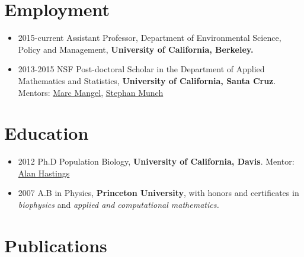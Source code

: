 \documentclass[10pt,sans]{moderncv}        %
\begin{document}
\makecvtitle


\hypersetup{urlcolor=links}

\hypertarget{employment}{%
\section{Employment}\label{employment}}

\begin{itemize}
\item
  2015-current Assistant Professor, Department of Environmental Science,
  Policy and Management, \textbf{University of California, Berkeley.}
\item
  2013-2015 NSF Post-doctoral Scholar in the Department of Applied
  Mathematics and Statistics, \textbf{University of California, Santa
  Cruz}. Mentors: \href{http://users.soe.ucsc.edu/~msmangel/}{Marc
  Mangel}, \href{http://swfsc.noaa.gov/staff.aspx?\&id=17294}{Stephan
  Munch}
\end{itemize}

\hypertarget{education}{%
\section{Education}\label{education}}

\begin{itemize}
\item
  2012 Ph.D Population Biology, \textbf{University of California,
  Davis}. Mentor: \href{http://two.ucdavis.edu/~me}{Alan Hastings}
\item
  2007 A.B in Physics, \textbf{Princeton University}, with honors and
  certificates in \emph{biophysics} and \emph{applied and computational
  mathematics.}
\end{itemize}

\hypertarget{publications}{%
\section{Publications}\label{publications}}
\end{document}
